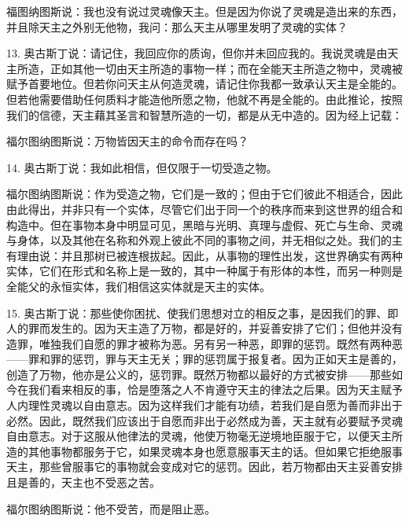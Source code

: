 福图纳图斯说：我也没有说过灵魂像天主。但是因为你说了灵魂是造出来的东西，并且除天主之外别无他物，我问：那么天主从哪里发明了灵魂的实体？\par

13. 奥古斯丁说：请记住，我回应你的质询，但你并未回应我的。我说灵魂是由天主所造，正如其他一切由天主所造的事物一样；而在全能天主所造之物中，灵魂被赋予首要地位。但若你问天主从何造灵魂，请记住你我都一致承认天主是全能的。但若他需要借助任何质料才能造他所愿之物，他就不再是全能的。由此推论，按照我们的信德，天主藉其圣言和智慧所造的一切，都是从无中造的。因为经上记载：\par

福尔图纳图斯说：万物皆因天主的命令而存在吗？\par

14. 奥古斯丁说：我如此相信，但仅限于一切受造之物。\par

福尔图纳图斯说：作为受造之物，它们是一致的；但由于它们彼此不相适合，因此由此得出，并非只有一个实体，尽管它们出于同一个的秩序而来到这世界的组合和构造中。但在事物本身中明显可见，黑暗与光明、真理与虚假、死亡与生命、灵魂与身体，以及其他在名称和外观上彼此不同的事物之间，并无相似之处。我们的主有理由说：并且那树已被连根拔起。因此，从事物的理性出发，这世界确实有两种实体，它们在形式和名称上是一致的，其中一种属于有形体的本性，而另一种则是全能父的永恒实体，我们相信这实体就是天主的实体。\par

15. 奥古斯丁说：那些使你困扰、使我们思想对立的相反之事，是因我们的罪、即人的罪而发生的。因为天主造了万物，都是好的，并妥善安排了它们；但他并没有造罪，唯独我们自愿的罪才被称为恶。另有另一种恶，即罪的惩罚。既然有两种恶——罪和罪的惩罚，罪与天主无关；罪的惩罚属于报复者。因为正如天主是善的，创造了万物，他亦是公义的，惩罚罪。既然万物都以最好的方式被安排——那些如今在我们看来相反的事，恰是堕落之人不肯遵守天主的律法之后果。因为天主赋予人内理性灵魂以自由意志。因为这样我们才能有功绩，若我们是自愿为善而非出于必然。因此，既然我们应该出于自愿而非出于必然成为善，天主就有必要赋予灵魂自由意志。对于这服从他律法的灵魂，他使万物毫无逆境地臣服于它，以便天主所造的其他事物都服务于它，如果灵魂本身也愿意服事天主的话。但如果它拒绝服事天主，那些曾服事它的事物就会变成对它的惩罚。因此，若万物都由天主妥善安排且是善的，天主也不受恶之苦。\par

福尔图纳图斯说：他不受苦，而是阻止恶。\par


